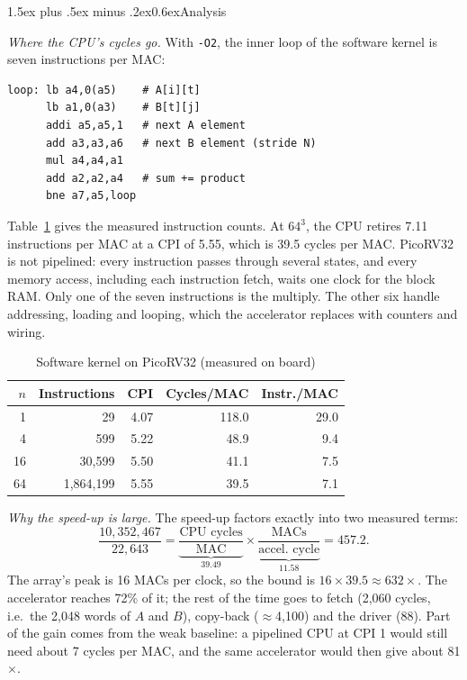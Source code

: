 \documentclass[10pt,twocolumn,a4paper]{article}
\makeatletter
\renewcommand\subsection{\@startsection{subsection}{2}{\z@}%
  {1.5ex plus .5ex minus .2ex}{0.6ex}{\normalfont\itshape}}
\makeatother
\begin{document}
\subsection{Analysis}\label{sec:analysis}

\emph{Where the CPU's cycles go.} With \texttt{-O2}, the inner loop of the
software kernel is seven instructions per MAC:
\begin{lstlisting}
loop: lb a4,0(a5)    # A[i][t]
      lb a1,0(a3)    # B[t][j]
      addi a5,a5,1   # next A element
      add a3,a3,a6   # next B element (stride N)
      mul a4,a4,a1
      add a2,a2,a4   # sum += product
      bne a7,a5,loop
\end{lstlisting}
Table~\ref{tab:cpu} gives the measured instruction counts. At $64^3$, the CPU
retires 7.11 instructions per MAC at a CPI of 5.55, which is 39.5 cycles per
MAC. PicoRV32 is not pipelined: every instruction passes through several
states, and every memory access, including each instruction fetch, waits one
clock for the block RAM. Only one of the seven instructions is the multiply.
The other six handle addressing, loading and looping, which the accelerator
replaces with counters and wiring.

\begin{table}[t]
\caption{Software kernel on PicoRV32 (measured on board)}\label{tab:cpu}
\centering\footnotesize
\begin{tabular}{rrrrr}
\toprule
$n$ & Instructions & CPI & Cycles/MAC & Instr./MAC \\
\midrule
1 & 29 & 4.07 & 118.0 & 29.0 \\
4 & 599 & 5.22 & 48.9 & 9.4 \\
16 & 30,599 & 5.50 & 41.1 & 7.5 \\
64 & 1,864,199 & 5.55 & 39.5 & 7.1 \\
\bottomrule
\end{tabular}
\end{table}

\emph{Why the speed-up is large.} The speed-up factors exactly into two
measured terms:
\begin{equation}
\frac{10{,}352{,}467}{22{,}643}
=\underbrace{\frac{\text{CPU cycles}}{\text{MAC}}}_{39.49}
\times\underbrace{\frac{\text{MACs}}{\text{accel.\ cycle}}}_{11.58}
=457.2 .
\end{equation}
The array's peak is 16 MACs per clock, so the bound is
$16\times39.5\approx632\times$. The accelerator reaches 72\% of it; the rest of
the time goes to fetch (2,060 cycles, i.e.\ the 2,048 words of $A$ and $B$),
copy-back ($\approx$4,100) and the driver (88). Part of the gain comes from the
weak baseline: a pipelined CPU at CPI 1 would still need about 7 cycles per MAC,
and the same accelerator would then give about 81$\times$.
\end{document}

